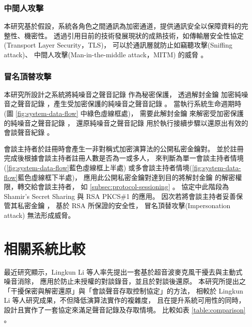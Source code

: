 \subsubsection{中間人攻擊}

    本研究基於假設，系統各角色之間通訊為加密通道，提供通訊安全以保障資料的完整性、機密性。
透過引用目前的技術發展現狀的成熟技術，如傳輸層安全性協定(Transport Layer Security，TLS)，
可以於通訊層就防止如竊聽攻擊(Sniffing attack)、
中間人攻擊(Man-in-the-middle attack，MITM) 的威脅 \cite{rfc5246}\cite{rfc8446}。


\subsubsection{冒名頂替攻擊}

    本研究所設計之系統將純噪音之聲音記錄 \DEFrecN 作為秘密保護，
透過解封金鑰 \DEFunsealKey 加密純噪音之聲音記錄 \DEFrecN，產生受加密保護的純噪音之聲音記錄 \DEFrecP。
當執行系統生命週期時(圖 \ref{fig:system-data-flow} 中綠色虛線框處)，
需要此解封金鑰 \DEFunsealKey 來解密受加密保護的純噪音之聲音記錄 \DEFrecP，
還原純噪音之聲音記錄 \DEFrecN 用於執行接續步驟以還原出有效的會談聲音紀錄 \DEFrecREV。

    會談主持者於註冊時會產生一非對稱式加密演算法的公開私密金鑰對。
並於註冊完成後根據會談主持者註冊人數是否為一或多人，
來判斷為單一會談主持者情境(\ref{fig:system-data-flow}藍色虛線框上半處)
或多會談主持者情境(\ref{fig:system-data-flow}藍色虛線框下半處)，
應用此公開私密金鑰對達到目的將解封金鑰 \DEFunsealKey 的解密權限，轉交給會談主持者，
如 \ref{subsec:protocol-sessioning} 。
協定中此階段為 Shamir's Secret Sharing \cite{shamir1979share}
與 RSA PKCS\#1 \cite{rfc8017} 的應用。
因次若將會談主持者妥善保管其私密金鑰 \DEFprivateKey，
基於 RSA \cite{rfc8017} 所保證的安全性，
冒名頂替攻擊(Impersonation attack) 無法形成威脅。


\section{相關系統比較}\label{sec:comparison}

    最近研究顯示，Lingkun Li 等人率先提出一套基於超音波麥克風干擾去與主動式噪音消除，
應用於防止未授權的對談錄音，並且於對談後還原\cite{li2020patronus}。
本研究所提出之「干擾保密與解密還原」與「會談聲音存取控制協定」的方法，
相較於 Lingkun Li 等人研究成果，不但降低演算法實作的複雜度，
且在提升系統可用性的同時，設計且實作了一套協定來滿足聲音記錄及存取情境。
比較如表 \ref{table:comparison} 。

